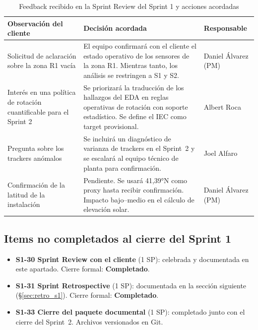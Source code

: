 \documentclass[12pt,a4paper]{article}
\newcommand{\done}{\textcolor{completed}{\textbf{Completado}}}
\begin{document}
\begin{table}[H]
\centering
\caption{Feedback recibido en la Sprint Review del Sprint 1 y acciones acordadas}
\label{tab:review_s1_feedback}
\renewcommand{\arraystretch}{1.4}
\begin{tabularx}{\textwidth}{p{5cm} X p{2.5cm}}
\toprule
\textbf{Observación del cliente} & \textbf{Decisión acordada} & \textbf{Responsable} \\
\midrule
Solicitud de aclaración sobre la zona R1 vacía
  & El equipo confirmará con el cliente el estado operativo de los sensores de la zona R1. Mientras tanto, los análisis se restringen a S1 y S2.
  & Daniel Álvarez (PM) \\
Interés en una política de rotación cuantificable para el Sprint 2
  & Se priorizará la traducción de los hallazgos del EDA en reglas operativas de rotación con soporte estadístico. Se define el IEC como target provisional.
  & Albert Roca \\
Pregunta sobre los trackers anómalos
  & Se incluirá un diagnóstico de varianza de trackers en el Sprint~2 y se escalará al equipo técnico de planta para confirmación.
  & Joel Alfaro \\
Confirmación de la latitud de la instalación
  & Pendiente. Se usará 41,39°N como proxy hasta recibir confirmación. Impacto bajo--medio en el cálculo de elevación solar.
  & Daniel Álvarez (PM) \\
\bottomrule
\end{tabularx}
\end{table}

\subsection{Items no completados al cierre del Sprint 1}

\begin{itemize}[noitemsep]
  \item \textbf{S1-30 Sprint Review con el cliente} (1 SP): celebrada y documentada en este apartado. Cierre formal: \done.
  \item \textbf{S1-31 Sprint Retrospective} (1 SP): documentada en la sección siguiente (\S\ref{sec:retro_s1}). Cierre formal: \done.
  \item \textbf{S1-33 Cierre del paquete documental} (1 SP): completado junto con el cierre del Sprint~2. Archivos versionados en Git.
\end{itemize}

\newpage
\end{document}
